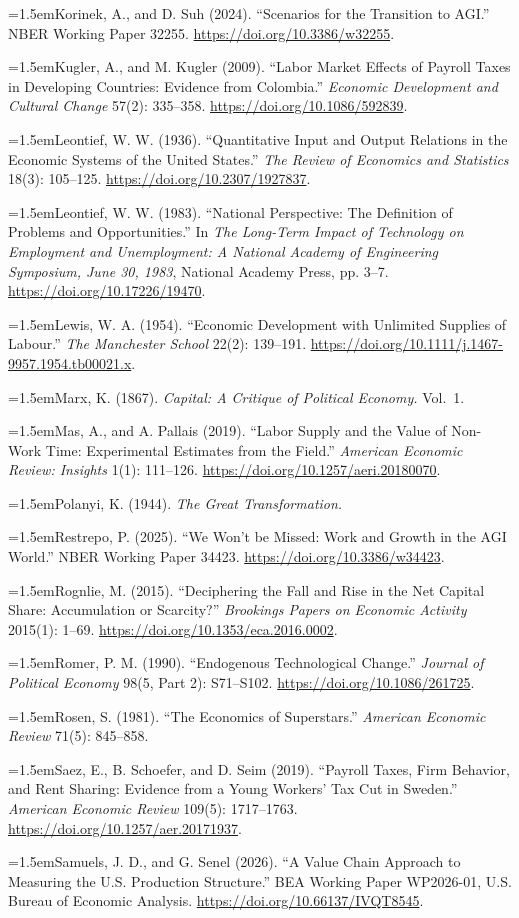 \documentclass[12pt]{article}
\theoremstyle{plain}
\theoremstyle{definition}
\theoremstyle{remark}
\newcommand{\refentry}[1]{\par\hangindent=1.5em\hangafter=1\noindent #1}
\begin{document}
{\refentry{Korinek, A., and D. Suh (2024). ``Scenarios for the Transition to AGI.'' NBER Working Paper 32255. \url{https://doi.org/10.3386/w32255}.}
\refentry{Kugler, A., and M. Kugler (2009). ``Labor Market Effects of Payroll Taxes in Developing Countries: Evidence from Colombia.'' \emph{Economic Development and Cultural Change} 57(2): 335--358. \url{https://doi.org/10.1086/592839}.}
\refentry{Leontief, W. W. (1936). ``Quantitative Input and Output Relations in the Economic Systems of the United States.'' \emph{The Review of Economics and Statistics} 18(3): 105--125. \url{https://doi.org/10.2307/1927837}.}
\refentry{Leontief, W. W. (1983). ``National Perspective: The Definition of Problems and Opportunities.'' In \emph{The Long-Term Impact of Technology on Employment and Unemployment: A National Academy of Engineering Symposium, June 30, 1983}, National Academy Press, pp. 3--7. \url{https://doi.org/10.17226/19470}.}
\refentry{Lewis, W. A. (1954). ``Economic Development with Unlimited Supplies of Labour.'' \emph{The Manchester School} 22(2): 139--191. \url{https://doi.org/10.1111/j.1467-9957.1954.tb00021.x}.}
\refentry{Marx, K. (1867). \emph{Capital: A Critique of Political Economy.} Vol.~1.}
\refentry{Mas, A., and A. Pallais (2019). ``Labor Supply and the Value of Non-Work Time: Experimental Estimates from the Field.'' \emph{American Economic Review: Insights} 1(1): 111--126. \url{https://doi.org/10.1257/aeri.20180070}.}
\refentry{Polanyi, K. (1944). \emph{The Great Transformation.}}
\refentry{Restrepo, P. (2025). ``We Won't be Missed: Work and Growth in the AGI World.'' NBER Working Paper 34423. \url{https://doi.org/10.3386/w34423}.}
\refentry{Rognlie, M. (2015). ``Deciphering the Fall and Rise in the Net Capital Share: Accumulation or Scarcity?'' \emph{Brookings Papers on Economic Activity} 2015(1): 1--69. \url{https://doi.org/10.1353/eca.2016.0002}.}
\refentry{Romer, P. M. (1990). ``Endogenous Technological Change.'' \emph{Journal of Political Economy} 98(5, Part 2): S71--S102. \url{https://doi.org/10.1086/261725}.}
\refentry{Rosen, S. (1981). ``The Economics of Superstars.'' \emph{American Economic Review} 71(5): 845--858.}
\refentry{Saez, E., B. Schoefer, and D. Seim (2019). ``Payroll Taxes, Firm Behavior, and Rent Sharing: Evidence from a Young Workers' Tax Cut in Sweden.'' \emph{American Economic Review} 109(5): 1717--1763. \url{https://doi.org/10.1257/aer.20171937}.}
\refentry{Samuels, J. D., and G. Senel (2026). ``A Value Chain Approach to Measuring the U.S. Production Structure.'' BEA Working Paper WP2026-01, U.S. Bureau of Economic Analysis. \url{https://doi.org/10.66137/IVQT8545}.}
}
\end{document}
